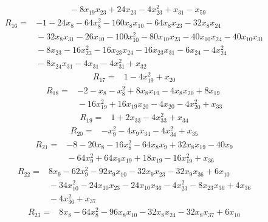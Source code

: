 {\begin{align*}
&{}  - 8x_{19} x_{23} + 24x_{23} - 4x_{23}^{2} + x_{31} - x_{59}
\end{align*}
\begin{align*}
R_{16} ={}& -1 - 24x_{8} - 64x_{8}^{2} - 160x_{8} x_{10} - 64x_{8} x_{23} - 32x_{8} x_{24} \\
&{}  - 32x_{8} x_{31} - 26x_{10} - 100x_{10}^{2} - 80x_{10} x_{23} - 40x_{10} x_{24} - 40x_{10} x_{31} \\
&{}  - 8x_{23} - 16x_{23}^{2} - 16x_{23} x_{24} - 16x_{23} x_{31} - 6x_{24} - 4x_{24}^{2} \\
&{}  - 8x_{24} x_{31} - 4x_{31} - 4x_{31}^{2} + x_{32}
\end{align*}
\begin{align*}
R_{17} ={}& 1 - 4x_{19}^{2} + x_{20}
\end{align*}
\begin{align*}
R_{18} ={}& -2 - x_{8} - x_{8}^{2} + 8x_{8} x_{19} - 4x_{8} x_{20} + 8x_{19} \\
&{}  - 16x_{19}^{2} + 16x_{19} x_{20} - 4x_{20} - 4x_{20}^{2} + x_{33}
\end{align*}
\begin{align*}
R_{19} ={}& 1 + 2x_{33} - 4x_{33}^{2} + x_{34}
\end{align*}
\begin{align*}
R_{20} ={}& -x_{9}^{2} - 4x_{9} x_{34} - 4x_{34}^{2} + x_{35}
\end{align*}
\begin{align*}
R_{21} ={}& -8 - 20x_{8} - 16x_{8}^{2} - 64x_{8} x_{9} + 32x_{8} x_{19} - 40x_{9} \\
&{}  - 64x_{9}^{2} + 64x_{9} x_{19} + 18x_{19} - 16x_{19}^{2} + x_{36}
\end{align*}
\begin{align*}
R_{22} ={}& 8x_{9} - 62x_{9}^{2} - 92x_{9} x_{10} - 32x_{9} x_{23} - 32x_{9} x_{36} + 6x_{10} \\
&{}  - 34x_{10}^{2} - 24x_{10} x_{23} - 24x_{10} x_{36} - 4x_{23}^{2} - 8x_{23} x_{36} + 4x_{36} \\
&{}  - 4x_{36}^{2} + x_{37}
\end{align*}
\begin{align*}
R_{23} ={}& 8x_{8} - 64x_{8}^{2} - 96x_{8} x_{10} - 32x_{8} x_{24} - 32x_{8} x_{37} + 6x_{10} \\

\end{align*}}
